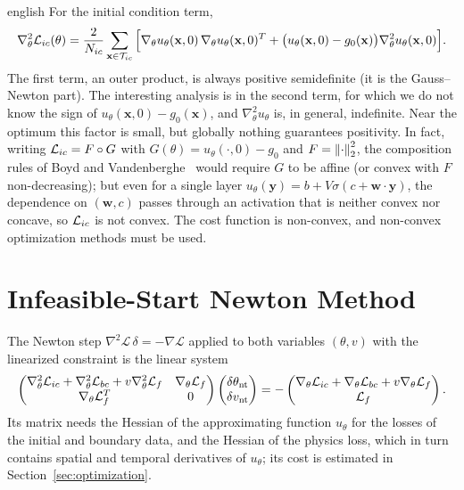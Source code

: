\begin{hyphenrules}{english}
For the initial condition term,
\begin{equation}
  \nabla^2_\theta\mathcal{L}_{ic}(\theta)=\frac{2}{N_{ic}}\sum_{\mathbf{x}\in\mathcal{T}_{ic}}
  \Big[\nabla_\theta u_\theta(\mathbf{x},0)\,\nabla_\theta u_\theta(\mathbf{x},0)^{T}
  +\big(u_\theta(\mathbf{x},0)-g_0(\mathbf{x})\big)\nabla^2_\theta u_\theta(\mathbf{x},0)\Big].
  \label{eq:hessian-ic}
\end{equation}
The first term, an outer product, is always positive semidefinite (it is the Gauss--Newton part). The
interesting analysis is in the second term, for which we do not know the sign of
$u_\theta(\mathbf{x},0)-g_0(\mathbf{x})$, and $\nabla^2_\theta u_\theta$ is, in general, indefinite. Near the optimum this
factor is small, but globally nothing guarantees positivity. In fact, writing $\mathcal{L}_{ic}=F\circ G$ with
$G(\theta)=u_\theta(\cdot,0)-g_0$ and $F=\left\lVert \cdot \right\rVert_2^2$, the composition rules of
Boyd and Vandenberghe~\cite{boyd2004} would require $G$ to be affine (or convex with $F$ non-decreasing); but even for a
single layer $u_\theta(\mathbf{y})=b+V\sigma(c+\mathbf{w}\cdot\mathbf{y})$, the dependence on $(\mathbf{w},c)$ passes
through an activation that is neither convex nor concave, so $\mathcal{L}_{ic}$ is not convex. The cost function
is non-convex, and non-convex optimization methods must be used.

\section{Infeasible-Start Newton Method}\label{app-sec:newton}

The Newton step $\nabla^2\mathscr{L}\,\delta=-\nabla\mathscr{L}$ applied to both variables $(\theta,v)$
with the linearized constraint is the linear system \cite{boyd2004}
\begin{equation}
  \begin{pmatrix}
    \nabla^2_\theta\mathcal{L}_{ic}+\nabla^2_\theta\mathcal{L}_{bc}+v\nabla^2_\theta\mathcal{L}_f & \nabla_\theta\mathcal{L}_f\\
    \nabla_\theta\mathcal{L}_f^{T} & 0
  \end{pmatrix}
  \begin{pmatrix}\delta\theta_{\mathrm{nt}}\\ \delta v_{\mathrm{nt}}\end{pmatrix}
  =-\begin{pmatrix}\nabla_\theta\mathcal{L}_{ic}+\nabla_\theta\mathcal{L}_{bc}+v\nabla_\theta\mathcal{L}_f\\ \mathcal{L}_f\end{pmatrix}.
  \label{eq:newton-system}
\end{equation}
Its matrix needs the Hessian of the approximating function $u_\theta$ for the losses of the initial and
boundary data, and the Hessian of the physics loss, which in turn contains spatial and temporal
derivatives of $u_\theta$; its cost is estimated in Section~\ref{sec:optimization}.


\end{hyphenrules}
